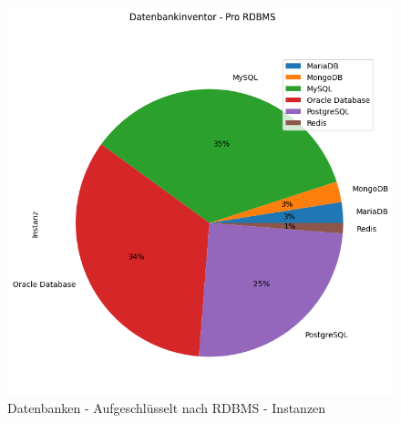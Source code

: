 \begin{flushleft}
\begin{figure}[H]
        \includegraphics[width=1\linewidth]{source/pandas_data_chart_plotter/db_inventory_per_rdbms_instance}
        \caption{Datenbanken - Aufgeschlüsselt nach RDBMS - Instanzen}
        \label{fig:db_inventory_per_rdbms_instance}
    \end{figure}
\end{flushleft}
